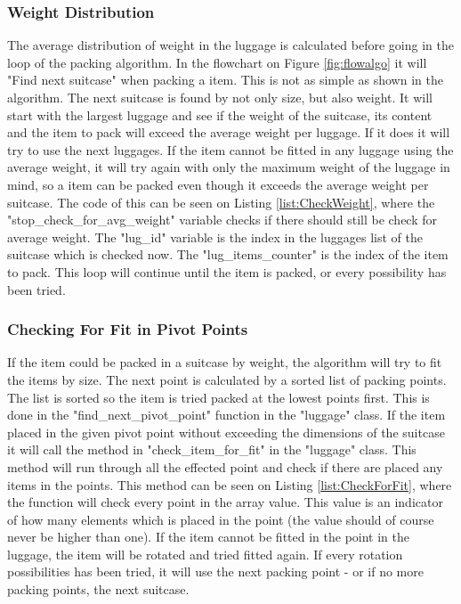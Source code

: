 \subsubsection{Weight Distribution}
The average distribution of weight in the luggage is calculated before going in the loop of the packing algorithm. In the flowchart on Figure \ref{fig:flowalgo} it will "Find next suitcase" when packing a item. This is not as simple as shown in the algorithm. The next suitcase is found by not only size, but also weight. It will start with the largest luggage and see if the weight of the suitcase, its content and the item to pack will exceed the average weight per luggage. If it does it will try to use the next luggages. If the item cannot be fitted in any luggage using the average weight, it will try again with only the maximum weight of the luggage in mind, so a item can be packed even though it exceeds the average weight per suitcase. The code of this can be seen on Listing \ref{list:CheckWeight}, where the "stop\_check\_for\_avg\_weight" variable checks if there should still be check for average weight. The "lug\_id" variable is the index in the luggages list of the suitcase which is checked now. The "lug\_items\_counter" is the index of the item to pack. This loop will continue until the item is packed, or every possibility has been tried.
\subsubsection{Checking For Fit in Pivot Points}
If the item could be packed in a suitcase by weight, the algorithm will try to fit the items by size. The next point is calculated by a sorted list of packing points. The list is sorted so the item is tried packed at the lowest points first. This is done in the "find\_next\_pivot\_point" function in the "luggage" class. If the item placed in the given pivot point without exceeding the dimensions of the suitcase it will call the method in "check\_item\_for\_fit" in the "luggage" class. This method will run through all the effected point and check if there are placed any items in the points. This method can be seen on Listing \ref{list:CheckForFit}, where the function will check every point in the array value. This value is an indicator of how many elements which is placed in the point (the value should of course never be higher than one).
If the item cannot be fitted in the point in the luggage, the item will be rotated and tried fitted again. If every rotation possibilities has been tried, it will use the next packing point - or if no more packing points, the next suitcase.
